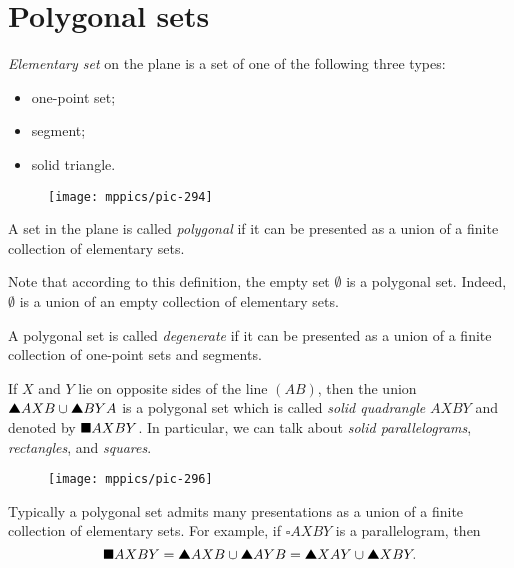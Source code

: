 \section*{Polygonal sets}

\emph{Elementary set} on the plane 
is a set of one of the following three types:
\begin{itemize}
 \item one-point set;
 \item segment;
 \item solid triangle.
\end{itemize}

\begin{wrapfigure}{r}{24 mm}
\vskip-12mm
\centering
\texttt{[image: mppics/pic-294]}
\end{wrapfigure}

A set in the plane is called \emph{polygonal} if it can be presented as a union of a finite collection of elementary sets.

Note that according to this definition, the empty set $\emptyset$
is a polygonal set.
Indeed, $\emptyset$ is a union of an empty collection of elementary sets.

A polygonal set is called \emph{degenerate} if it can be presented as a union of a finite collection of one-point sets and segments.

If $X$ and $Y$ lie on opposite sides of the line $(AB)$,
then the union
$\solidtriangle AXB\cup \solidtriangle BYA$
is a polygonal set which is called \emph{solid quadrangle} $AXBY$ and denoted by 
$\blacksquare AXBY$.
In particular, 
we can talk about \emph{solid parallelograms}, \emph{rectangles}, and \emph{squares}.

\begin{wrapfigure}{o}{38 mm}
\centering
\texttt{[image: mppics/pic-296]}
\end{wrapfigure}

Typically a polygonal set admits many 
presentations as a union of a finite collection of elementary sets.
For example, if $\square AXBY$ is a parallelogram, then
\[\solidsquare AXBY=\solidtriangle AXB\cup \solidtriangle AYB=\solidtriangle XAY\cup \solidtriangle XBY.\]

